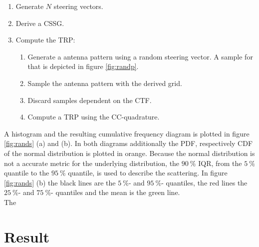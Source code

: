 \begin{enumerate}
\item Generate $N$ steering vectors.
\item Derive a \ac{CSSG}.
\item Compute the \ac{TRP}:
\begin{enumerate}
\item Generate a antenna pattern using a random steering vector. A sample for that is depicted in figure \ref{fig:randp}.
\item Sample the antenna pattern with the derived grid.
\item Discard samples dependent on the \ac{CTF}.
\item Compute a \ac{TRP} using the \ac{CC}-quadrature.
\end{enumerate}
\end{enumerate}

A histogram and the resulting cumulative frequency diagram is plotted in figure \ref{fig:rands} (a) and (b). In both diagrams additionally the \ac{PDF}, respectively \ac{CDF} of the normal distribution is plotted in orange. Because the normal distribution is not a accurate metric for the underlying distribution, the $\SI{90}{\percent}$ \ac{IQR}, from the $\SI{5}{\percent}$ quantile to the $\SI{95}{\percent}$ quantile, is used to describe the scattering. In figure \ref{fig:rands} (b) the black lines are the $\SI{5}{\percent}$- and $\SI{95}{\percent}$- quantiles, the red lines the $\SI{25}{\percent}$- and $\SI{75}{\percent}$- quantiles and the mean is the green line.\\
The 

\section{Result}